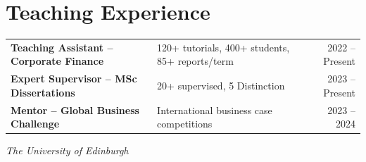 \section{Teaching Experience}

\begin{tabularx}{\linewidth}{@{}l X r@{}}
\textbf{Teaching Assistant -- Corporate Finance} & 120+ tutorials, 400+ students, 85+ reports/term & 2022 -- Present \\
\textbf{Expert Supervisor -- MSc Dissertations} & 20+ supervised, 5 Distinction & 2023 -- Present \\
\textbf{Mentor -- Global Business Challenge} & International business case competitions & 2023 -- 2024 \\
\end{tabularx}
\textit{The University of Edinburgh}

